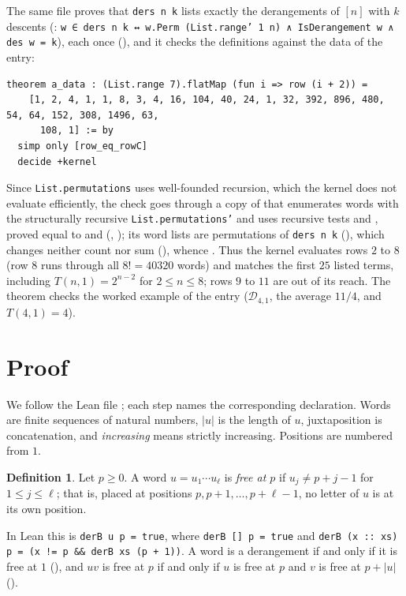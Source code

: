\documentclass[11pt]{amsart}
\theoremstyle{plain}
\theoremstyle{definition}
\newtheorem{definition}[theorem]{Definition}
\newcommand{\cD}{\mathcal{D}}
\begin{document}
The same file proves that \texttt{ders n k} lists exactly the derangements of $[n]$ with $k$ descents (: \texttt{w ∈ ders n k ↔ w.Perm (List.range' 1 n) ∧ IsDerangement w ∧ des w = k}), each once (), and it checks the definitions against the data of the entry:
\begin{lstlisting}
theorem a_data : (List.range 7).flatMap (fun i => row (i + 2)) =
    [1, 2, 4, 1, 1, 8, 3, 4, 16, 104, 40, 24, 1, 32, 392, 896, 480, 54, 64, 152, 308, 1496, 63,
      108, 1] := by
  simp only [row_eq_rowC]
  decide +kernel
\end{lstlisting}
Since \texttt{List.permutations} uses well-founded recursion, which the kernel does not evaluate efficiently, the check goes through a copy  of  that enumerates words with the structurally recursive \texttt{List.permutations'} and uses recursive tests  and , proved equal to  and  (, ); its word lists are permutations of \texttt{ders n k} (), which changes neither count nor sum (), whence . Thus the kernel evaluates rows $2$ to $8$ (row $8$ runs through all $8!=40320$ words) and matches the first $25$ listed terms, including $T(n,1)=2^{n-2}$ for $2\le n\le8$; rows $9$ to $11$ are out of its reach. The theorem  checks the worked example of the entry ($\cD_{4,1}$, the average $11/4$, and $T(4,1)=4$).

\section{Proof}\label{sec:proof}

We follow the Lean file ; each step names the corresponding declaration. Words are finite sequences of natural numbers, $|u|$ is the length of $u$, juxtaposition is concatenation, and \emph{increasing} means strictly increasing. Positions are numbered from $1$.

\begin{definition}\label{def:free}
Let $p\ge0$. A word $u=u_1\cdots u_\ell$ is \emph{free at $p$} if $u_j\ne p+j-1$ for $1\le j\le\ell$; that is, placed at positions $p,p+1,\dots,p+\ell-1$, no letter of $u$ is at its own position.
\end{definition}

In Lean this is \texttt{derB u p = true}, where \texttt{derB [] p = true} and \texttt{derB (x :: xs) p = (x != p \&\& derB xs (p + 1))}. A word is a derangement if and only if it is free at $1$ (), and $uv$ is free at $p$ if and only if $u$ is free at $p$ and $v$ is free at $p+|u|$ ().
\end{document}
